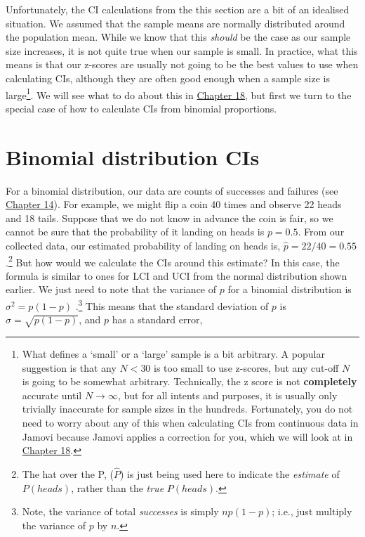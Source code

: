 \documentclass[
]{scrbook}
\begin{document}
Unfortunately, the CI calculations from the this section are a bit of an idealised situation.
We assumed that the sample means are normally distributed around the population mean.
While we know that this \emph{should} be the case as our sample size increases, it is not quite true when our sample is small.
In practice, what this means is that our z-scores are usually not going to be the best values to use when calculating CIs, although they are often good enough when a sample size is large\footnote{What defines a `small' or a `large' sample is a bit arbitrary. A popular suggestion is that any \(N < 30\) is too small to use z-scores, but any cut-off \(N\) is going to be somewhat arbitrary. Technically, the z score is not \textbf{completely} accurate until \(N \to \infty\), but for all intents and purposes, it is usually only trivially inaccurate for sample sizes in the hundreds. Fortunately, you do not need to worry about any of this when calculating CIs from continuous data in Jamovi because Jamovi applies a correction for you, which we will look at in \protect\hyperlink{Chapter_18}{Chapter 18}.}.
We will see what to do about this in \protect\hyperlink{Chapter_18}{Chapter 18}, but first we turn to the special case of how to calculate CIs from binomial proportions.

\hypertarget{binomial-distribution-cis}{%
\section{Binomial distribution CIs}\label{binomial-distribution-cis}}

For a binomial distribution, our data are counts of successes and failures (see \protect\hyperlink{Chapter_14}{Chapter 14}).
For example, we might flip a coin 40 times and observe 22 heads and 18 tails.
Suppose that we do not know in advance the coin is fair, so we cannot be sure that the probability of it landing on heads is \(p = 0.5\).
From our collected data, our estimated probability of landing on heads is, \(\hat{p} = 22/40 = 0.55\).\footnote{The hat over the P, (\(\hat{P}\)) is just being used here to indicate the \emph{estimate} of \(P(heads)\), rather than the \emph{true} \(P(heads)\).}
But how would we calculate the CIs around this estimate?
In this case, the formula is similar to ones for LCI and UCI from the normal distribution shown earlier.
We just need to note that the variance of \(p\) for a binomial distribution is \(\sigma^{2} = p\left(1 - p\right)\) \citep{Box1978, Sokal1995}.\footnote{Note, the variance of total \emph{successes} is simply \(np\left(1 - p\right)\); i.e., just multiply the variance of \(p\) by \(n\).}
This means that the standard deviation of \(p\) is \(\sigma = \sqrt{p\left(1 - p\right)}\), and \(p\) has a standard error,
\end{document}
